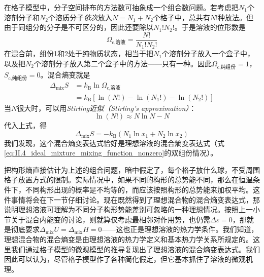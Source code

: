 \documentclass[main.tex]{subfiles}
\begin{document}
在格子模型中，分子空间排布的方法数可抽象成一个组合数问题。若考虑把$N_1$个溶剂分子和$N_2$个溶质分子\emph{依次}放入$N=N_1+N_2$个格子中，总共有$N!$种放法。但由于同组分的分子是不可区分的，因此还要除以$N_1!N_2!$。于是溶液的位形数是
\begin{equation}
  \Omega_\text{c,溶液}=\frac{N!}{N_1!N_2!}
  \label{eq:III.1_omega_c_solution}
\end{equation}
在混合前，组份1和2处于纯物质状态，相当于把$N_1$个溶剂分子放入一个盒子中，以及把$N_2$个溶剂分子放入第二个盒子中的方法——只有一种。因此$\Omega_\text{c,纯组份}=1$，$S_\text{c,纯组份}=0$。混合熵变就是
\[\begin{aligned}
    \Delta_\text{mix}S & =k_\text{B}\ln\Omega_\text{c,溶液}                                                     \\
                       & =k_\text{B}\left[\ln\left(N!\right)-\ln\left(N_1!\right)-\ln\left(N_2!\right)\right]
  \end{aligned}\]
当$N$很大时，可以用\emph{Stirling近似（Stirling's approximation）}：
\[\ln\left(N!\right)\approx N\ln N-N\]
代入上式，得
\begin{equation}\label{eq:III.1_mixing_entropy_regular_solution}
  \Delta_\text{mix}S=-k_\text{B}\left(N_1\ln x_1+N_2\ln x_2\right)
\end{equation}
我们发现，这个混合熵变表达式恰好是理想溶液的混合熵变表达式（式\eqref{eq:II.4_ideal_mixture_mixing_function_nonzero}的双组份情况）。

把构形熵直接估计为上述的组合问题，暗中假定了，每个格子放什么球，不受周围格子放置方式的限制。实际情况中，如果不同的构形的总势能不同，那么在恒温条件下，不同构形出现的概率是不均等的，而应该按照构形的总势能来加权平均。这件事情将会在下一节仔细讨论。现在既然得到了理想混合物的混合熵变表达式，那说明理想溶液可理解为不同分子构形势能差别可忽略的一种理想情况。按照上一小节关于混合内能变的讨论，则就算仅考虑最相邻对作用势，也仍需$\Delta\varepsilon=0$，那就是彻底要求$\Delta_\text{mix}U=\Delta_\text{mix}H=0$——这也正是理想溶液的热力学条件。我们知道，理想混合物的混合熵变是由理想溶液的热力学定义和基本热力学关系所规定的。这里我们通过格子模型的微观模型的推导复现出了理想溶液的混合熵变表达式。我们因此可以认为，尽管格子模型作了各种简化假定，但它基本抓住了溶液的微观机理。
\end{document}
